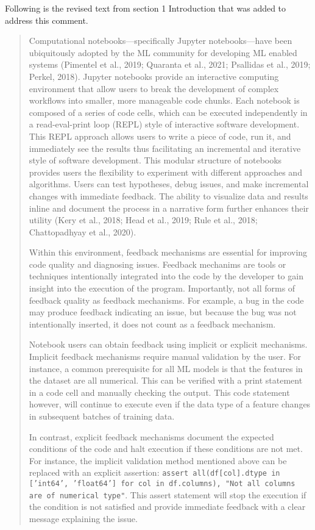 \documentclass[11pt,fleqn]{article}
\begin{document}
Following is the revised text from section 1 Introduction that was added to address this comment.

\begin{quote}
  Computational notebooks---specifically Jupyter notebooks---have been ubiquitously adopted by the ML community for developing ML enabled systems (Pimentel et al., 2019; Quaranta et al., 2021; Psallidas et al., 2019; Perkel, 2018). Jupyter notebooks provide an interactive computing environment that allow users to break the development of complex workflows into smaller, more manageable code chunks. Each notebook is composed of a series of code cells, which can be executed independently in a read-eval-print loop (REPL) style of interactive software development. This REPL approach allows users to write a piece of code, run it, and immediately see the results thus facilitating an incremental and iterative style of software development. This modular structure of notebooks provides users the flexibility to experiment with different approaches and algorithms. Users can test hypotheses, debug issues, and make incremental changes with immediate feedback. The ability to visualize data and results inline and document the process in a narrative form further enhances their utility (Kery et al., 2018; Head et al., 2019; Rule et al., 2018; Chattopadhyay et al., 2020).

  Within this environment, feedback mechanisms are essential for improving code quality and diagnosing issues. Feedback mechanims are tools or techniques intentionally integrated into the code by the developer to gain insight into the execution of the program. Importantly, not all forms of feedback quality as feedback mechanisms. For example, a bug in the code may produce feedback indicating an issue, but because the bug was not intentionally inserted, it does not count as a feedback mechanism.

  Notebook users can obtain feedback using implicit or explicit mechanisms. Implicit feedback mechanisms require manual validation by the user. For instance, a common prerequisite for all ML models is that the features in the dataset are all numerical. This can be verified with a print statement in a code cell and manually checking the output. This code statement however, will continue to execute even if the data type of a feature changes in subsequent batches of training data.

  In contrast, explicit feedback mechanisms document the expected conditions of the code and halt execution if these conditions are not met. For instance, the implicit validation method mentioned above can be replaced with an explicit assertion: \texttt{assert all(df[col].dtype in ['int64', 'float64'] for col in df.columns), "Not all columns are of numerical type"}. This assert statement will stop the execution if the condition is not satisfied and provide immediate feedback with a clear message explaining the issue.


\end{quote}
\end{document}

